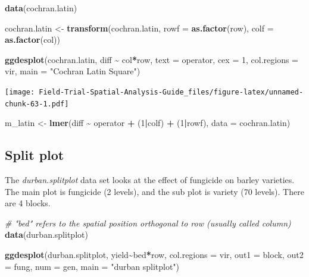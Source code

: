\documentclass[
]{book}
\newenvironment{Shaded}{\begin{snugshade}}{\end{snugshade}}
\newcommand{\AttributeTok}[1]{\textcolor[rgb]{0.13,0.29,0.53}{#1}}
\newcommand{\CommentTok}[1]{\textcolor[rgb]{0.56,0.35,0.01}{\textit{#1}}}
\newcommand{\DecValTok}[1]{\textcolor[rgb]{0.00,0.00,0.81}{#1}}
\newcommand{\FunctionTok}[1]{\textcolor[rgb]{0.13,0.29,0.53}{\textbf{#1}}}
\newcommand{\NormalTok}[1]{#1}
\newcommand{\OtherTok}[1]{\textcolor[rgb]{0.56,0.35,0.01}{#1}}
\newcommand{\SpecialCharTok}[1]{\textcolor[rgb]{0.81,0.36,0.00}{\textbf{#1}}}
\newcommand{\StringTok}[1]{\textcolor[rgb]{0.31,0.60,0.02}{#1}}
\begin{document}
\begin{Shaded}
\begin{Highlighting}[]
\FunctionTok{data}\NormalTok{(cochran.latin)}

\NormalTok{cochran.latin }\OtherTok{\textless{}{-}} \FunctionTok{transform}\NormalTok{(cochran.latin, }\AttributeTok{rowf =} \FunctionTok{as.factor}\NormalTok{(row), }\AttributeTok{colf =} \FunctionTok{as.factor}\NormalTok{(col))}

\FunctionTok{ggdesplot}\NormalTok{(cochran.latin, diff }\SpecialCharTok{\textasciitilde{}}\NormalTok{ col}\SpecialCharTok{*}\NormalTok{row, }
        \AttributeTok{text =}\NormalTok{ operator, }\AttributeTok{cex =} \DecValTok{1}\NormalTok{, }\AttributeTok{col.regions =}\NormalTok{ vir, }
        \AttributeTok{main =} \StringTok{"Cochran Latin Square"}\NormalTok{)}
\end{Highlighting}
\end{Shaded}

\texttt{[image: Field-Trial-Spatial-Analysis-Guide\_files/figure-latex/unnamed-chunk-63-1.pdf]}

\begin{Shaded}
\begin{Highlighting}[]
\NormalTok{m\_latin }\OtherTok{\textless{}{-}} \FunctionTok{lmer}\NormalTok{(diff }\SpecialCharTok{\textasciitilde{}}\NormalTok{ operator }\SpecialCharTok{+}\NormalTok{ (}\DecValTok{1}\SpecialCharTok{|}\NormalTok{colf) }\SpecialCharTok{+}\NormalTok{ (}\DecValTok{1}\SpecialCharTok{|}\NormalTok{rowf),}
               \AttributeTok{data =}\NormalTok{ cochran.latin)}
\end{Highlighting}
\end{Shaded}

\hypertarget{split-plot}{%
\subsection{Split plot}\label{split-plot}}

The \emph{durban.splitplot} data set looks at the effect of fungicide on barley varieties. The main plot is fungicide (2 levels), and the sub plot is variety (70 levels). There are 4 blocks.

\begin{Shaded}
\begin{Highlighting}[]
\CommentTok{\# "bed" refers to the spatial position orthogonal to row (usually called \textquotesingle{}column\textquotesingle{})}
\FunctionTok{data}\NormalTok{(durban.splitplot)}

\FunctionTok{ggdesplot}\NormalTok{(durban.splitplot, yield}\SpecialCharTok{\textasciitilde{}}\NormalTok{bed}\SpecialCharTok{*}\NormalTok{row, }\AttributeTok{col.regions =}\NormalTok{ vir,}
          \AttributeTok{out1 =}\NormalTok{ block, }\AttributeTok{out2 =}\NormalTok{ fung, }\AttributeTok{num =}\NormalTok{ gen, }
          \AttributeTok{main =} \StringTok{"durban splitplot"}\NormalTok{)}
\end{Highlighting}
\end{Shaded}
\end{document}
